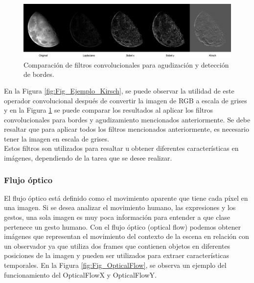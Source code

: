 \begin{onehalfspacing}
\begin{figure}[th]
	\centering
	\includegraphics[width=17cm,keepaspectratio]{XX_Figures/Fig_Comparacion_Filtros.png}
	\caption{\footnotesize Comparación de filtros convolucionales para agudización y detección de bordes.}
	\label{fig:Fig_Comparacion_Filtros}
\end{figure}


En la Figura \ref{fig:Fig_Ejemplo_Kirsch}, se puede observar la utilidad de este operador convolucional después de convertir la imagen de RGB a escala de grises y en la Figura \ref{fig:Fig_Comparacion_Filtros} se puede comparar los resultados al aplicar los filtros convolucionales para bordes y agudizamiento mencionados anteriormente. Se debe resaltar que para aplicar todos los filtros mencionados anteriormente, es necesario tener la imagen en escala de grises.\\

Estos filtros son utilizados para resaltar u obtener diferentes características en imágenes, dependiendo de la tarea que se desee realizar.

\subsubsection{Flujo óptico}
\label{OpticalFlow}

El flujo óptico está definido como el movimiento aparente que tiene cada píxel en una imagen. Si se desea analizar el movimiento humano, las expresiones y los gestos, una sola imagen es muy poca información para entender a que clase pertenece un gesto humano. Con el flujo óptico (optical flow) podemos obtener imágenes que representan el movimiento del contexto de la escena en relación con un observador ya que utiliza dos frames que contienen objetos en diferentes posiciones de la imagen y pueden ser utilizados para extraer características temporales.
En la Figura \ref{fig:Fig_OpticalFlow}, se observa un ejemplo del funcionamiento del OpticalFlowX y OpticalFlowY.


\end{onehalfspacing}
